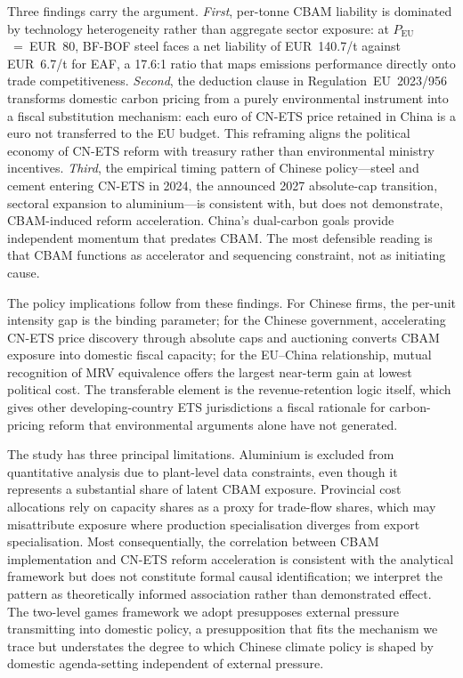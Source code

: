 \documentclass[letterpaper, 10pt, conference]{ieeeconf}
\begin{document}
Three findings carry the argument. \emph{First}, per-tonne CBAM
liability is dominated by technology heterogeneity rather than
aggregate sector exposure: at $P_{\mathrm{EU}}$~=~EUR~80, BF-BOF
steel faces a net liability of EUR~140.7/t against EUR~6.7/t for
EAF, a 17.6:1 ratio that maps emissions performance directly onto
trade competitiveness. \emph{Second}, the deduction clause in
Regulation~EU~2023/956 transforms domestic carbon pricing from a
purely environmental instrument into a fiscal substitution mechanism:
each euro of CN-ETS price retained in China is a euro not transferred
to the EU budget. This reframing aligns the political economy of
CN-ETS reform with treasury rather than environmental ministry
incentives. \emph{Third}, the empirical timing pattern of Chinese
policy---steel and cement entering CN-ETS in 2024, the announced 2027
absolute-cap transition, sectoral expansion to aluminium---is
consistent with, but does not demonstrate, CBAM-induced reform
acceleration. China's dual-carbon goals provide independent momentum
that predates CBAM. The most defensible reading is that CBAM
functions as accelerator and sequencing constraint, not as initiating
cause.

The policy implications follow from these findings. For Chinese
firms, the per-unit intensity gap is the binding parameter; for the
Chinese government, accelerating CN-ETS price discovery through
absolute caps and auctioning converts CBAM exposure into domestic
fiscal capacity; for the EU--China relationship, mutual recognition
of MRV equivalence offers the largest near-term gain at lowest
political cost. The transferable element is the revenue-retention
logic itself, which gives other developing-country ETS jurisdictions
a fiscal rationale for carbon-pricing reform that environmental
arguments alone have not generated.

The study has three principal limitations. Aluminium is excluded
from quantitative analysis due to plant-level data constraints, even
though it represents a substantial share of latent CBAM exposure.
Provincial cost allocations rely on capacity shares as a proxy for
trade-flow shares, which may misattribute exposure where production
specialisation diverges from export specialisation. Most
consequentially, the correlation between CBAM implementation and
CN-ETS reform acceleration is consistent with the analytical
framework but does not constitute formal causal identification; we
interpret the pattern as theoretically informed association rather
than demonstrated effect. The two-level games framework we adopt
presupposes external pressure transmitting into domestic policy, a
presupposition that fits the mechanism we trace but understates the
degree to which Chinese climate policy is shaped by domestic
agenda-setting independent of external pressure.
\end{document}
